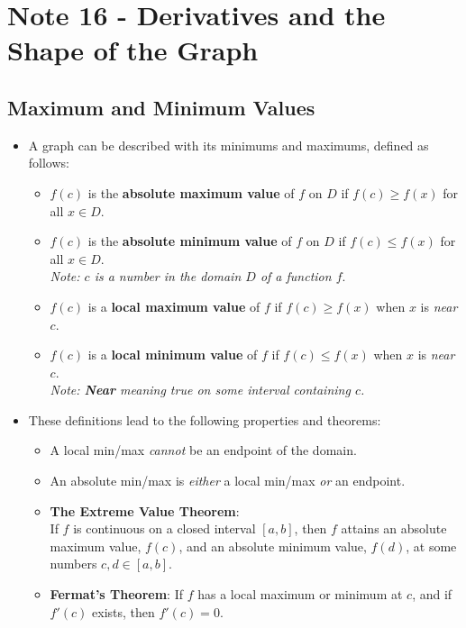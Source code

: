 \documentclass[10pt]{article}
\author{}
\date{}
\begin{document}
\section*{\centering Note 16 - Derivatives and the Shape of the Graph}

\subsection*{Maximum and Minimum Values}

\begin{itemize}
    \item A graph can be described with its minimums and maximums, defined as follows:
    \begin{itemize}[label=$\circ$]
        \item $f(c)$ is the \textbf{absolute maximum value} of $f$ on $D$ if $f(c) \geq f(x)$ for all $x \in D$.
        \item $f(c)$ is the \textbf{absolute minimum value} of $f$ on $D$ if $f(c) \leq f(x)$ for all $x \in D$. \\
        \textit{Note: $c$ is a number in the domain $D$ of a function $f$}.
        \item $f(c)$ is a \textbf{local maximum value} of $f$ if $f(c) \geq f(x)$ when $x$ is \textit{near} $c$.
        \item $f(c)$ is a \textbf{local minimum value} of $f$ if $f(c) \leq f(x)$ when $x$ is \textit{near} $c$. \\
        \textit{Note: \textbf{Near} meaning true on some interval containing $c$.}
    \end{itemize}

    \item These definitions lead to the following properties and theorems:
    \begin{itemize}[label=$\circ$]
        \item A local min/max \textit{cannot} be an endpoint of the domain.
        \item An absolute min/max is \textit{either} a local min/max \textit {or} an endpoint.
        \item \textbf{The Extreme Value Theorem}: \\ If $f$ is continuous on a closed interval $[a,b]$, then $f$ attains an absolute maximum value, $f(c)$, and an absolute minimum value, $f(d)$, at some numbers $c, d \in [a,b]$.
        \item \textbf{Fermat's Theorem}: If $f$ has a local maximum or minimum at $c$, and if $f'(c)$ exists, then $f'(c) = 0$.
    \end{itemize}
    

\end{itemize}
\end{document}
